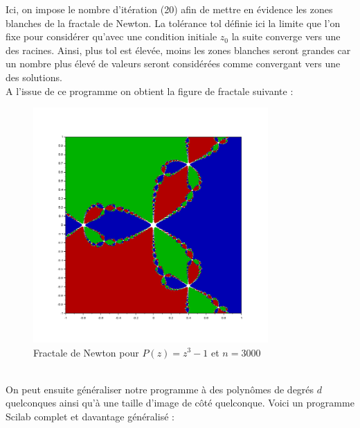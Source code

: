             Ici, on impose le nombre d'itération (20) afin de mettre en évidence les zones blanches de la fractale de Newton. La tolérance tol définie ici la limite que l'on fixe pour considérer qu'avec une condition initiale $z_0$ la suite converge vers une des racines. Ainsi, plus tol est élevée, moins les zones blanches seront grandes car un nombre plus élevé de valeurs seront considérées comme convergant vers une des solutions.
            \\
            A l'issue de ce programme on obtient la figure de fractale suivante :
            \begin{figure}[h]
              \centering
                \includegraphics[width=0.8\textwidth]{images/fractale_newton1.png}
              \caption{Fractale de Newton pour $P(z) = z^3-1$ et $n=3000$}
              \label{fig:fractale_newton1}
            \end{figure}
            \\On peut ensuite généraliser notre programme à des polynômes de degrés $d$ quelconques ainsi qu'à une taille d'image de côté quelconque. Voici un programme Scilab complet et davantage généralisé :
